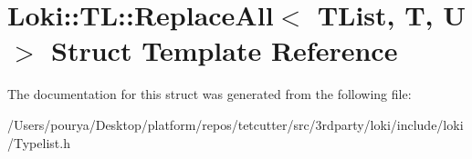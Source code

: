 \hypertarget{structLoki_1_1TL_1_1ReplaceAll}{}\section{Loki\+:\+:T\+L\+:\+:Replace\+All$<$ T\+List, T, U $>$ Struct Template Reference}
\label{structLoki_1_1TL_1_1ReplaceAll}


The documentation for this struct was generated from the following file\+:\begin{DoxyCompactItemize}
\item 
/\+Users/pourya/\+Desktop/platform/repos/tetcutter/src/3rdparty/loki/include/loki/Typelist.\+h\end{DoxyCompactItemize}
